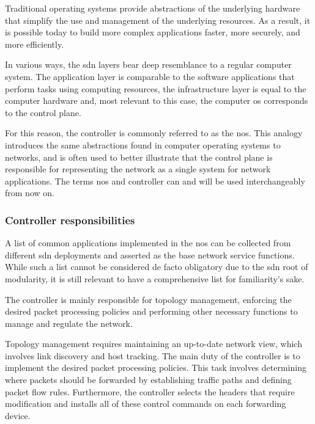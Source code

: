 Traditional operating systems provide abstractions of the underlying hardware that simplify the use and management of the underlying resources. As a result, it is possible today to build more complex applications faster, more securely, and more efficiently\cite{kreutz_software-defined_2015}. 

In various ways, the \gls{sdn} layers bear deep resemblance to a regular computer system\cite{thyagaturu_software_2016}. The application layer is comparable to the software applications that perform tasks using computing resources, the infrastructure layer is equal to the computer hardware and, most relevant to this case, the computer \gls{os} corresponds to the control plane. 

For this reason, the controller is commonly referred to as the \gls{nos}. This analogy introduces the same abstractions found in computer operating systems to networks\cite{kreutz_software-defined_2015}, and is often used to better illustrate that the control plane is responsible for representing the network as a single system for network applications\cite{nunes_survey_2014}. The terms \gls{nos} and controller can and will be used interchangeably from now on.

\subsubsection{Controller responsibilities}
A list of common applications implemented in the \gls{nos} can be collected from different \gls{sdn} deployments and asserted as the base network service functions\cite{kreutz_software-defined_2015}. While such a list cannot be considered de facto obligatory due to the \gls{sdn} root of modularity, it is still relevant to have a comprehensive list for familiarity's sake.

The controller is mainly responsible for topology management, enforcing the desired packet processing policies and performing other necessary functions to manage and regulate the network\cite{peterson_software-defined_2021}\cite{latif_comprehensive_2020}\cite{bifulco_survey_2018}\cite{kreutz_software-defined_2015}\cite{zhu_sdn_2020}. 

Topology management requires maintaining an up-to-date network view, which involves link discovery and host tracking.
The main duty of the controller is to implement the desired packet processing policies. This task involves determining where packets should be forwarded by establishing traffic paths and defining packet flow rules. Furthermore, the controller selects the headers that require modification and installs all of these control commands on each forwarding device.

